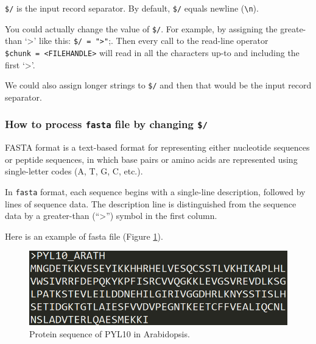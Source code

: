 \documentclass[]{book}
\begin{document}
\texttt{\$/} is the input record separator. By default, \texttt{\$/} equals newline (\texttt{\textbackslash{}n}).

You could actually change the value of \texttt{\$/}. For example, by assigning the greate-than `\textgreater{}' like this: \texttt{\$/\ =\ "\textgreater{}"};. Then every call to the read-line operator \texttt{\$chunk\ =\ \textless{}FILEHANDLE\textgreater{}} will read in all the characters up-to and including the first `\textgreater{}'.

We could also assign longer strings to \texttt{\$/} and then that would be the input record separator.

\hypertarget{how-to-process-fasta-file-by-changing}{%
\subsubsection{\texorpdfstring{How to process \texttt{fasta} file by changing \texttt{\$/}}{How to process fasta file by changing \$/}}\label{how-to-process-fasta-file-by-changing}}

FASTA format is a text-based format for representing either nucleotide sequences or peptide sequences, in which base pairs or amino acids are represented using single-letter codes (A, T, G, C, etc.).

In \texttt{fasta} format, each sequence begins with a single-line description, followed by lines of sequence data. The description line is distinguished from the sequence data by a greater-than (``\textgreater{}'') symbol in the first column.

Here is an example of fasta file (Figure \ref{fig:fastaPYL}).



\begin{figure}
\centering
\includegraphics{figures/fasta_pyl10_ara.png}
\caption{\label{fig:fastaPYL}Protein sequence of PYL10 in Arabidopsis.}
\end{figure}
\end{document}

